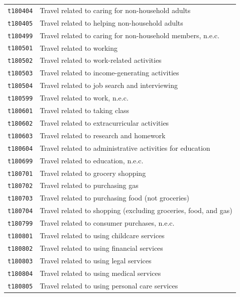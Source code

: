 \documentclass[11pt, a4paper]{article}
\begin{document}
\begin{longtable}{L{3cm} L{13cm}}
 \texttt{t180404} & Travel related to caring for non-household adults \\
\texttt{t180405} & Travel related to helping non-household adults \\
 \texttt{t180499} & Travel related to caring for non-household members, n.e.c. \\
\texttt{t180501} & Travel related to working \\
 \texttt{t180502} & Travel related to work-related activities \\
\texttt{t180503} & Travel related to income-generating activities \\
 \texttt{t180504} & Travel related to job search and interviewing \\
\texttt{t180599} & Travel related to work, n.e.c. \\
 \texttt{t180601} & Travel related to taking class \\
\texttt{t180602} & Travel related to extracurricular activities \\
 \texttt{t180603} & Travel related to research and homework \\
\texttt{t180604} & Travel related to administrative activities for education \\
 \texttt{t180699} & Travel related to education, n.e.c. \\
\texttt{t180701} & Travel related to grocery shopping \\
 \texttt{t180702} & Travel related to purchasing gas \\
\texttt{t180703} & Travel related to purchasing food (not groceries) \\
 \texttt{t180704} & Travel related to shopping (excluding groceries, food, and gas) \\
\texttt{t180799} & Travel related to consumer purchases, n.e.c. \\
 \texttt{t180801} & Travel related to using childcare services \\
\texttt{t180802} & Travel related to using financial services \\
 \texttt{t180803} & Travel related to using legal services \\
\texttt{t180804} & Travel related to using medical services \\
 \texttt{t180805} & Travel related to using personal care services \\

\end{longtable}
\end{document}
